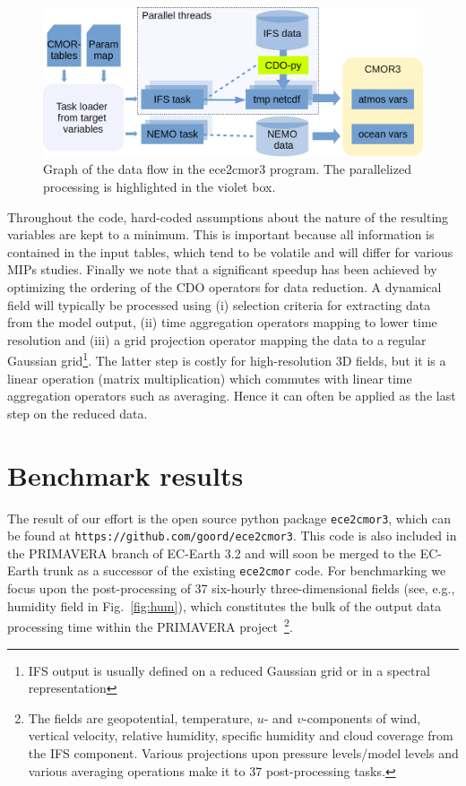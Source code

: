 \documentclass[procedia]{easychair}
\begin{document}
\begin{figure}[ht]
 \centering
 \includegraphics[width=\textwidth,clip]{ece2cmor3flowv3.png}
 \caption{Graph of the data flow in the ece2cmor3 program. The parallelized 
processing is highlighted in the violet box.}
\label{fig:design}
\end{figure}

Throughout the code, hard-coded assumptions about the nature of the resulting 
variables are kept to a minimum. This is important because all information is 
contained in the input tables, which tend to be volatile and will differ for 
various MIPs studies. Finally we note that a significant speedup has 
been achieved by optimizing the ordering of the CDO operators for data 
reduction. A dynamical field will typically be processed using (i) selection 
criteria for extracting data from the model output, (ii) time aggregation 
operators mapping to lower time resolution and (iii) a grid projection operator 
mapping the data to a regular Gaussian grid\footnote{IFS output is usually 
defined on a reduced Gaussian grid or in a spectral representation}. The latter 
step is costly for high-resolution 3D fields, but it is a linear operation 
(matrix multiplication) which commutes with linear time aggregation operators 
such as averaging. Hence it can often be applied as the last step on the 
reduced data.

\section{Benchmark results}
The result of our effort is the open source python package \texttt{ece2cmor3}, 
which can be found at \texttt{https://github.com/goord/ece2cmor3}. This code is 
also included in the PRIMAVERA branch of EC-Earth 3.2 and will soon be merged 
to the EC-Earth trunk as a successor of the existing \texttt{ece2cmor} code. 
For benchmarking we focus upon the post-processing of 37 six-hourly 
three-dimensional fields (see, e.g., humidity field in Fig.~\ref{fig:hum}), which constitutes the bulk of the output data 
processing time within the PRIMAVERA project~\footnote{The fields are geopotential, temperature, 
  $u$- and $v$-components of wind, vertical velocity, relative humidity, 
  specific humidity and cloud coverage from the IFS component. 
  Various projections upon pressure levels/model levels and various 
  averaging operations make it to 37 post-processing tasks.}.
  
\end{document}
